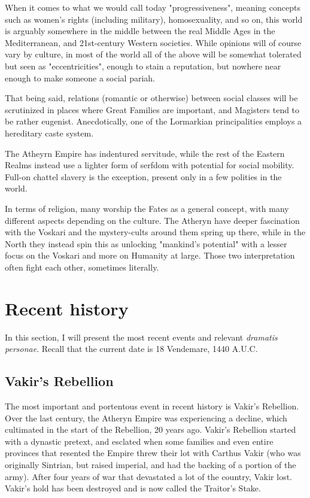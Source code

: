 When it comes to what we would call today "progressiveness", meaning concepts such as women's rights (including military), homosexuality, and so on, this world is arguably somewhere in the middle between the real Middle Ages in the Mediterranean, and 21st-century Western societies. While opinions will of course vary by culture, in most of the world all of the above will be somewhat tolerated but seen as "eccentricities", enough to stain a reputation, but nowhere near enough to make someone a social pariah.

That being said, relations (romantic or otherwise) between social classes will be scrutinized in places where Great Families are important, and Magisters tend to be rather eugenist. Anecdotically, one of the Lormarkian principalities employs a hereditary caste system.

The Atheyrn Empire has indentured servitude, while the rest of the Eastern Realms instead use a lighter form of serfdom with potential for social mobility. Full-on chattel slavery is the exception, present only in a few polities in the world.

In terms of religion, many worship the Fates as a general concept, with many different aspects depending on the culture. The Atheryn have deeper fascination with the Voskari and the mystery-cults around them spring up there, while in the North they instead spin this as unlocking "mankind's potential" with a lesser focus on the Voskari and more on Humanity at large. Those two interpretation often fight each other, sometimes literally.


\section{Recent history}

\label{recent_history}

In this section, I will present the most recent events and relevant \textit{dramatis personae}. Recall that the current date is 18 Vendemare, 1440 A.U.C.

\subsection{Vakir's Rebellion}

The most important and portentous event in recent history is Vakir's Rebellion. Over the last century, the Atheryn Empire was experiencing a decline, which cultimated in the start of the Rebellion, 20 years ago. Vakir's Rebellion started with a dynastic pretext, and esclated when some families and even entire provinces that resented the Empire threw their lot with Carthus Vakir (who was originally Sintrian, but raised imperial, and had the backing of a portion of the army). After four years of war that devastated a lot of the country, Vakir lost. Vakir's hold has been destroyed and is now called the Traitor's Stake.

